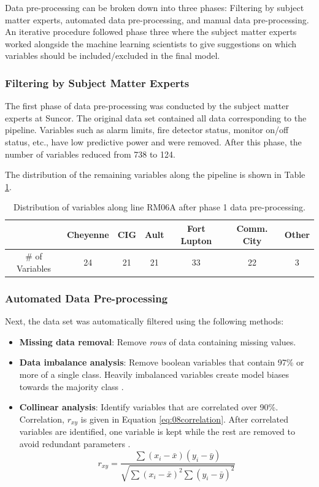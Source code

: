 Data pre-processing can be broken down into three phases: Filtering by subject matter experts, automated data pre-processing, and manual data pre-processing.  An iterative procedure followed phase three where the subject matter experts worked alongside the machine learning scientists to give suggestions on which variables should be included/excluded in the final model.

\subsubsection{Filtering by Subject Matter Experts}
The first phase of data pre-processing was conducted by the subject matter experts at Suncor.  The original data set contained all data corresponding to the pipeline.  Variables such as alarm limits, fire detector status, monitor on/off status, etc., have low predictive power and were removed.  After this phase, the number of variables reduced from 738 to 124.  

The distribution of the remaining variables along the pipeline is shown in Table \ref{tab:08Ph1Data}.
\begin{table}[h]
    \centering
    {
    \begin{tabular}{ c | c | c | c | c | c | c}
             &  Cheyenne & CIG & Ault & Fort Lupton & Comm. City & Other      \\
        \hline
        \# of Variables  &  24  &  21  &  21  &  33  &  22  &  3  \\
    \end{tabular}}
    \caption{Distribution of variables along line RM06A after phase 1 data pre-processing.}
    \label{tab:08Ph1Data}
\end{table}

\subsubsection{Automated Data Pre-processing}
Next, the data set was automatically filtered using the following methods:

\begin{itemize}
    \item \textbf{Missing data removal}: Remove \textit{rows} of data containing missing values.
    \item \textbf{Data imbalance analysis}: Remove boolean variables that contain 97\% or more of a single class.  Heavily imbalanced variables create model biases towards the majority class \cite{data_preprocessing}.
    \item \textbf{Collinear analysis}: Identify variables that are correlated over 90\%. Correlation, $r_{xy}$ is given in Equation \ref{eq:08correlation}. After correlated variables are identified, one variable is kept while the rest are removed to avoid redundant parameters \cite{data_preprocessing}.
    \begin{equation}
        r_{xy} = \frac{\sum(x_i - \bar{x})(y_i - \bar{y})}{\sqrt{\sum(x_i - \bar{x})^2\sum(y_i-\bar{y})^2}}
        \label{eq:08correlation}
    \end{equation}
    
\end{itemize}

